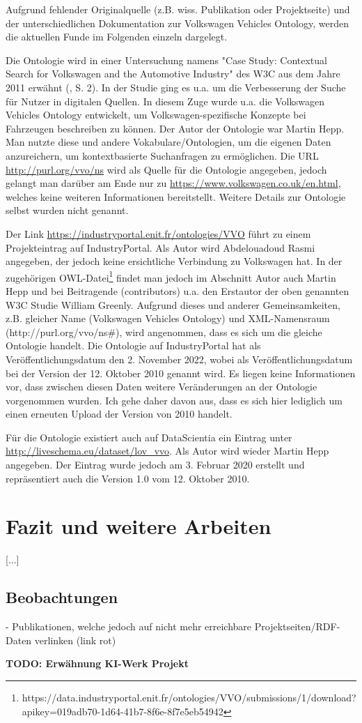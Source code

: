 \documentclass{article}
\begin{document}
Aufgrund fehlender Originalquelle (z.B. wiss. Publikation oder Projektseite) und der unterschiedlichen Dokumentation zur Volkswagen Vehicles Ontology, werden die aktuellen Funde im Folgenden einzeln dargelegt.

Die Ontologie wird in einer Untersuchung namens "Case Study: Contextual Search for Volkswagen and the Automotive Industry" des W3C aus dem Jahre 2011 erwähnt (\cite{greenly2011case}, S. 2).
In der Studie ging es u.a. um die Verbesserung der Suche für Nutzer in digitalen Quellen.
In diesem Zuge wurde u.a. die Volkswagen Vehicles Ontology entwickelt, um Volkswagen-spezifische Konzepte bei Fahrzeugen beschreiben zu können.
Der Autor der Ontologie war Martin Hepp.
Man nutzte diese und andere Vokabulare/Ontologien, um die eigenen Daten anzureichern, um kontextbasierte Suchanfragen zu ermöglichen.
Die URL \url{http://purl.org/vvo/ns} wird als Quelle für die Ontologie angegeben, jedoch gelangt man darüber am Ende nur zu \url{https://www.volkswagen.co.uk/en.html}, welches keine weiteren Informationen bereitstellt.
Weitere Details zur Ontologie selbst wurden nicht genannt.

Der Link \url{https://industryportal.enit.fr/ontologies/VVO} führt zu einem Projekteintrag auf IndustryPortal.
Als Autor wird Abdelouadoud Rasmi angegeben, der jedoch keine ersichtliche Verbindung zu Volkswagen hat.
In der zugehörigen OWL-Datei\footnote{https://data.industryportal.enit.fr/ontologies/VVO/submissions/1/download?apikey=019adb70-1d64-41b7-8f6e-8f7e5eb54942} findet man jedoch im Abschnitt Autor auch Martin Hepp und bei Beitragende (contributors) u.a. den Erstautor der oben genannten W3C Studie William Greenly.
Aufgrund dieses und anderer Gemeinsamkeiten, z.B. gleicher Name (Volkswagen Vehicles Ontology) und XML-Namensraum (http://purl.org/vvo/ns\#), wird angenommen, dass es sich um die gleiche Ontologie handelt. Die Ontologie auf IndustryPortal hat als Veröffentlichungsdatum den 2. November 2022, wobei als Veröffentlichungsdatum bei der Version der 12. Oktober 2010 genannt wird.
Es liegen keine Informationen vor, dass zwischen diesen Daten weitere Veränderungen an der Ontologie vorgenommen wurden.
Ich gehe daher davon aus, dass es sich hier lediglich um einen erneuten Upload der Version von 2010 handelt.

Für die Ontologie existiert auch auf DataScientia ein Eintrag unter \url{http://liveschema.eu/dataset/lov\_vvo}.
Als Autor wird wieder Martin Hepp angegeben.
Der Eintrag wurde jedoch am 3. Februar 2020 erstellt und repräsentiert auch die Version 1.0 vom 12. Oktober 2010.


\section{Fazit und weitere Arbeiten}

[...]

\subsection{Beobachtungen}

- Publikationen, welche jedoch auf nicht mehr erreichbare Projektseiten/RDF-Daten verlinken (link rot)


\textbf{TODO: Erwähnung KI-Werk Projekt}



\medskip

\printbibliography
\end{document}
